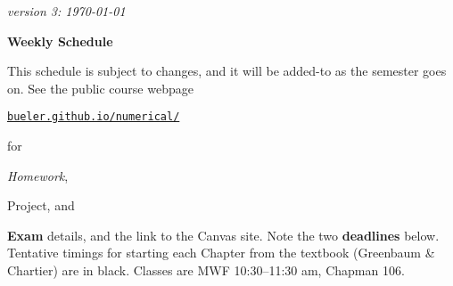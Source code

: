 \documentclass[12pt]{article}
\newcommand{\due}[1]{\strut {\color{BrickRed} \textsl{#1}}}
\newcommand{\proj}[1]{\strut {\color{RedOrange} #1}}
\newcommand{\ee}[1]{\strut {\color{Blue} \textbf{#1}}}
\newcommand{\dlinline}[1]{{\color{Purple} \textbf{#1}}}
\newcommand{\dl}[1]{{\small \dlinline{#1}}}
\begin{document}
\hfill \small \emph{version 3: \today} \normalsize

\bigskip\bigskip
\centerline{\Large \textbf{Weekly Schedule}}

\bigskip
This schedule is subject to changes, and it will be added-to as the semester goes on.  See the public course webpage

\medskip

\centerline{\href{https://bueler.github.io/numerical/index.html}{\texttt{bueler.github.io/numerical/}}}

\noindent for \due{Homework}, \proj{Project}, and \ee{Exam} details, and the link to the Canvas site.  Note the two \dl{deadlines} below.  Tentative timings for starting each Chapter from the textbook (Greenbaum \& Chartier) are in black.  Classes are MWF 10:30--11:30 am, Chapman 106.

\bigskip
\end{document}
